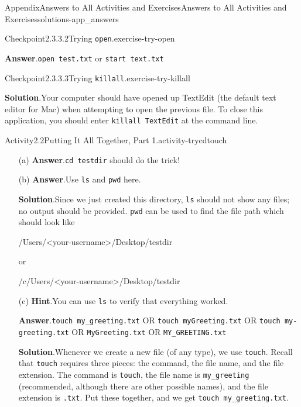 \documentclass[twoside,10pt,]{book}
\newcommand{\blocktitlefont}{\relax}
\newcommand{\mono}[1]{\texttt{#1}}
\begin{document}
\begin{solutions-chapter}{Appendix}{Answers to All Activities and Exercises}{}{Answers to All Activities and Exercises}{}{}{solutions-app_answers}
\begin{inlinesolution}{Checkpoint}{2.3.3.2}{Trying \mono{open}.}{exercise-try-open}
\par\smallskip%
\noindent\textbf{\blocktitlefont Answer}.\hypertarget{answer-try-open-c-back}{}\quad{}\mono{open test.txt} or \mono{start text.txt}%
\end{inlinesolution}%
\begin{inlinesolution}{Checkpoint}{2.3.3.3}{Trying \mono{killall}.}{exercise-try-killall}%
\par\smallskip%
\noindent\textbf{\blocktitlefont Solution}.\hypertarget{solution-try-killall-c-back}{}\quad{}Your computer should have opened up TextEdit (the default text editor for Mac) when attempting to open the previous file. To close this application, you should enter \mono{killall TextEdit} at the command line.%
\end{inlinesolution}%
\begin{activitysolution}{Activity}{2.2}{Putting It All Together, Part 1.}{activity-trycdtouch}%
\begin{enumerate}[font=\bfseries,label=(\alph*),ref=\alph*]%
\item[(a)]\noindent\textbf{\blocktitlefont Answer}.\hypertarget{answer-trycdtouch-d-b-back}{}\quad{}\mono{cd testdir} should do the trick!%
\item[(b)]\noindent\textbf{\blocktitlefont Answer}.\hypertarget{answer-trycdtouch-e-b-back}{}\quad{}Use \mono{ls} and \mono{pwd} here.%
\par\smallskip%
\noindent\textbf{\blocktitlefont Solution}.\hypertarget{solution-trycdtouch-e-c-back}{}\quad{}Since we just created this directory, \mono{ls} should not show any files; no output should be provided. \mono{pwd} can be used to find the file path which should look like%
\begin{codedisplay}
/Users/<your-username>/Desktop/testdir
\end{codedisplay}
or%
\begin{codedisplay}
/c/Users/<your-username>/Desktop/testdir
\end{codedisplay}
%
\item[(c)]\noindent\textbf{\blocktitlefont Hint}.\hypertarget{hint-trycdtouch-f-b-back}{}\quad{}You can use \mono{ls} to verify that everything worked.%
\par\smallskip%
\noindent\textbf{\blocktitlefont Answer}.\hypertarget{answer-trycdtouch-f-c-back}{}\quad{}\mono{touch my\_greeting.txt} OR \mono{touch myGreeting.txt} OR \mono{touch my-greeting.txt} OR \mono{MyGreeting.txt} OR \mono{MY\_GREETING.txt}%
\par\smallskip%
\noindent\textbf{\blocktitlefont Solution}.\hypertarget{solution-trycdtouch-f-d-back}{}\quad{}Whenever we create a new file (of any type), we use \mono{touch}. Recall that \mono{touch} requires three pieces: the command, the file name, and the file extension. The command is \mono{touch}, the file name is \mono{my\_greeting} (recommended, although there are other possible names), and the file extension is \mono{.txt}. Put these together, and we get \mono{touch my\_greeting.txt}.%

\end{enumerate}
\end{activitysolution}
\end{solutions-chapter}
\end{document}
